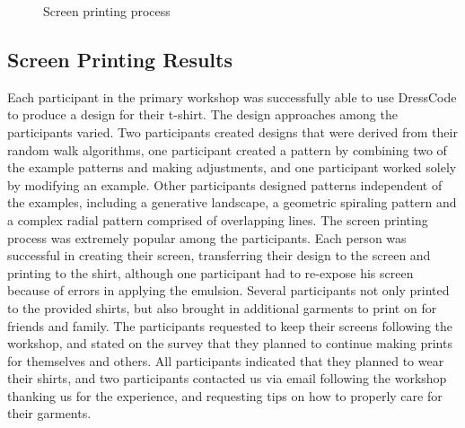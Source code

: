 \documentclass{sigchi}
\begin{document}
\begin{center}
\begin{figure}[h!]
\caption{Screen printing process}
\label{fig:screen_printing_process}
\end{figure}
\end{center}

\subsection{Screen Printing Results}
Each participant in the primary workshop was successfully able to use DressCode to produce a design for their t-shirt. The design approaches among the participants varied. Two participants created designs that were derived from their random walk algorithms, one participant created a pattern by combining two of the example patterns and making adjustments, and one participant worked solely by modifying an example. Other participants designed patterns independent of the examples, including a generative landscape, a geometric spiraling pattern and a complex radial pattern comprised of overlapping lines. The screen printing process was extremely popular among the participants. Each person was successful in creating their screen, transferring their design to the screen and printing to the shirt, although one participant had to re-expose his screen because of errors in applying the emulsion. Several participants not only printed to the provided shirts, but also brought in additional garments to print on for friends and family. The participants requested to keep their screens following the workshop, and stated on the survey that they planned to continue making prints for themselves and others. All participants indicated that they planned to wear their shirts, and two participants contacted us via email following the workshop thanking us for the experience, and requesting tips on how to properly care for their garments. 
\end{document}
